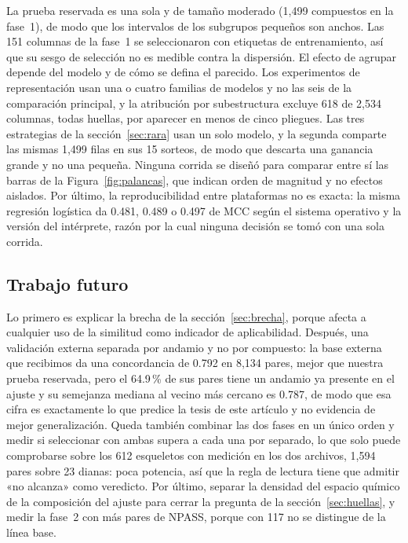 \documentclass[twocolumn,10pt,letterpaper]{article}
\begin{document}
La prueba reservada es una sola y de tamaño moderado (1,499 compuestos en la fase~1), de modo que los intervalos de los subgrupos pequeños son anchos. Las 151 columnas de la fase~1 se seleccionaron con etiquetas de entrenamiento, así que su sesgo de selección no es medible contra la dispersión. El efecto de agrupar depende del modelo y de cómo se defina el parecido. Los experimentos de representación usan una o cuatro familias de modelos y no las seis de la comparación principal, y la atribución por subestructura excluye 618 de 2,534 columnas, todas huellas, por aparecer en menos de cinco pliegues. Las tres estrategias de la sección~\ref{sec:rara} usan un solo modelo, y la segunda comparte las mismas 1,499 filas en sus 15 sorteos, de modo que descarta una ganancia grande y no una pequeña. Ninguna corrida se diseñó para comparar entre sí las barras de la Figura~\ref{fig:palancas}, que indican orden de magnitud y no efectos aislados. Por último, la reproducibilidad entre plataformas no es exacta: la misma regresión logística da 0.481, 0.489 o 0.497 de MCC según el sistema operativo y la versión del intérprete, razón por la cual ninguna decisión se tomó con una sola corrida.

\subsection{Trabajo futuro}
\label{sec:futuro}

Lo primero es explicar la brecha de la sección~\ref{sec:brecha}, porque afecta a cualquier uso de la similitud como indicador de aplicabilidad. Después, una validación externa separada por andamio y no por compuesto: la base externa que recibimos da una concordancia de 0.792 en 8,134 pares, mejor que nuestra prueba reservada, pero el 64.9\,\% de sus pares tiene un andamio ya presente en el ajuste y su semejanza mediana al vecino más cercano es 0.787, de modo que esa cifra es exactamente lo que predice la tesis de este artículo y no evidencia de mejor generalización. Queda también combinar las dos fases en un único orden y medir si seleccionar con ambas supera a cada una por separado, lo que solo puede comprobarse sobre los 612 esqueletos con medición en los dos archivos, 1,594 pares sobre 23 dianas: poca potencia, así que la regla de lectura tiene que admitir «no alcanza» como veredicto. Por último, separar la densidad del espacio químico de la composición del ajuste para cerrar la pregunta de la sección~\ref{sec:huellas}, y medir la fase~2 con más pares de NPASS, porque con 117 no se distingue de la línea base.
\end{document}
